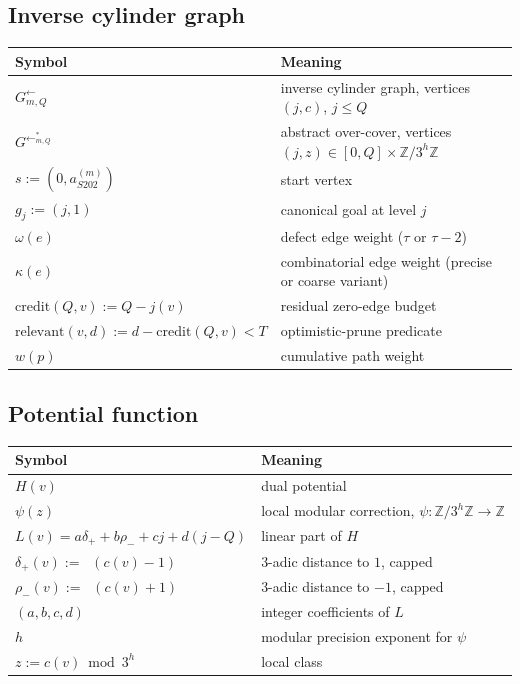 \documentclass[11pt,a4paper]{article}
\theoremstyle{plain}
\theoremstyle{definition}
\newcommand{\ZZ}{\mathbb{Z}}
\newcommand{\aSat}{a_{S202}^{(m)}}
\newcommand{\credit}{\mathrm{credit}}
\newcommand{\relevant}{\mathrm{relevant}}
\newcommand{\InvG}{G^{\!\leftarrow}}
\DeclareMathOperator{\nuthree}{\nu_3}
\begin{document}
\subsection*{Inverse cylinder graph}

\begin{center}\footnotesize
\begin{tabular}{ll}
\toprule
Symbol & Meaning \\
\midrule
$\InvG_{m, Q}$ & inverse cylinder graph, vertices $(j, c)$, $j \le Q$ \\
$\InvG^{*}_{m, Q}$ & abstract over-cover, vertices $(j, z) \in [0, Q] \times \ZZ/3^h\ZZ$ \\
$s := (0, \aSat)$ & start vertex \\
$g_j := (j, 1)$ & canonical goal at level $j$ \\
$\omega(e)$ & defect edge weight ($\tau$ or $\tau - 2$) \\
$\kappa(e)$ & combinatorial edge weight (precise or coarse variant) \\
$\credit(Q, v) := Q - j(v)$ & residual zero-edge budget \\
$\relevant(v, d) := d - \credit(Q, v) < T$ & optimistic-prune predicate \\
$w(p)$ & cumulative path weight \\
\bottomrule
\end{tabular}
\end{center}

\subsection*{Potential function}

\begin{center}\footnotesize
\begin{tabular}{ll}
\toprule
Symbol & Meaning \\
\midrule
$H(v)$ & dual potential \\
$\psi(z)$ & local modular correction, $\psi : \ZZ/3^h\ZZ \to \ZZ$ \\
$L(v) = a \delta_+ + b \rho_- + c j + d (j - Q)$ & linear part of $H$ \\
$\delta_+(v) := \nuthree(c(v) - 1)$ & 3-adic distance to $1$, capped \\
$\rho_-(v) := \nuthree(c(v) + 1)$ & 3-adic distance to $-1$, capped \\
$(a, b, c, d)$ & integer coefficients of $L$ \\
$h$ & modular precision exponent for $\psi$ \\
$z := c(v) \bmod 3^h$ & local class \\
\bottomrule
\end{tabular}
\end{center}
\end{document}
